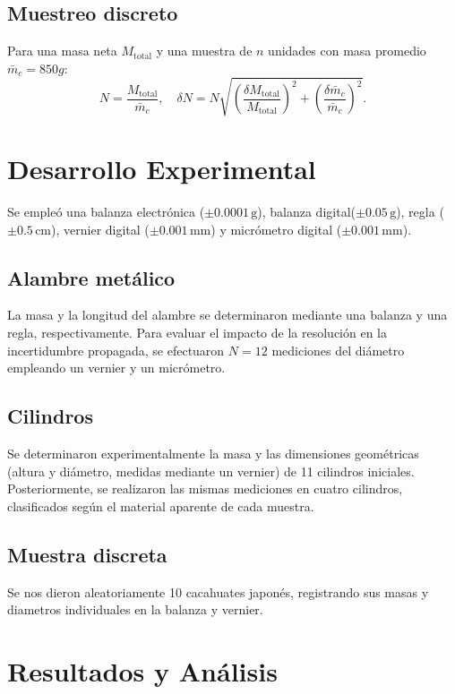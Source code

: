 \documentclass[10pt, letterpaper, twocolumn]{article}
\begin{document}
\subsection{Muestreo discreto}
Para una masa neta $M_{\mathrm{total}}$ y una muestra de $n$ unidades con masa promedio $\bar{m}_c=850g$:
\begin{equation}
    N = \frac{M_{\mathrm{total}}}{\bar{m}_c}, \quad \delta N = N \sqrt{\left(\frac{\delta M_{\mathrm{total}}}{M_{\mathrm{total}}}\right)^2 + \left(\frac{\delta \bar{m}_c}{\bar{m}_c}\right)^2}.
    \label{eq:cacahuates}
\end{equation}

\section{Desarrollo Experimental}
Se empleó una balanza electrónica ($\pm 0.0001\,\mathrm{g}$), balanza digital($\pm 0.05\,\mathrm{g}$), regla ($\pm 0.5\,\mathrm{cm}$), vernier digital ($\pm 0.001\,\mathrm{mm}$) y micrómetro digital  ($\pm 0.001\,\mathrm{mm}$).

\subsection{Alambre metálico}
La masa y la longitud del alambre se determinaron mediante una balanza y una regla, respectivamente. Para evaluar el impacto de la resolución en la incertidumbre propagada, se efectuaron $N=12$ mediciones del diámetro empleando un vernier y un micrómetro.

\subsection{Cilindros}
Se determinaron experimentalmente la masa y las dimensiones geométricas (altura y diámetro, medidas mediante un vernier) de 11 cilindros iniciales. Posteriormente, se realizaron las mismas mediciones en cuatro cilindros, clasificados según el material aparente de cada muestra.

\subsection{Muestra discreta}
Se nos dieron aleatoriamente 10 cacahuates japonés, registrando sus masas y diametros individuales en la balanza y vernier.

\section{Resultados y Análisis}
\end{document}
